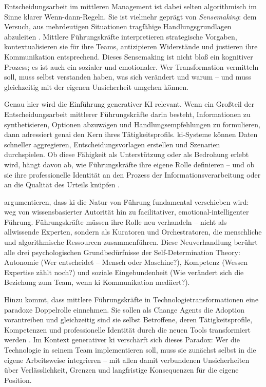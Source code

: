 Entscheidungsarbeit im mittleren Management ist dabei selten algorithmisch im Sinne klarer Wenn-dann-Regeln. Sie ist vielmehr geprägt von \textit{Sensemaking}: dem Versuch, aus mehrdeutigen Situationen tragfähige Handlungsgrundlagen abzuleiten \parencite{quaquebekeNowNewNext2023}. Mittlere Führungskräfte interpretieren strategische Vorgaben, kontextualisieren sie für ihre Teams, antizipieren Widerstände und justieren ihre Kommunikation entsprechend. Dieses Sensemaking ist nicht bloß ein kognitiver Prozess; es ist auch ein sozialer und emotionaler. Wer Transformation vermitteln soll, muss selbst verstanden haben, was sich verändert und warum -- und muss gleichzeitig mit der eigenen Unsicherheit umgehen können.

Genau hier wird die Einführung generativer KI relevant. Wenn ein Großteil der Entscheidungsarbeit mittlerer Führungskräfte darin besteht, Informationen zu synthetisieren, Optionen abzuwägen und Handlungsempfehlungen zu formulieren, dann adressiert \gls{genai} den Kern ihres Tätigkeitsprofils. \acrshort{ki}-Systeme können Daten schneller aggregieren, Entscheidungsvorlagen erstellen und Szenarien durchspielen. Ob diese Fähigkeit als Unterstützung oder als Bedrohung erlebt wird, hängt davon ab, wie Führungskräfte ihre eigene Rolle definieren -- und ob sie ihre professionelle Identität an den Prozess der Informationsverarbeitung oder an die Qualität des Urteils knüpfen \parencite{quaquebekeNowNewNext2023}.

\textcite{quaquebekeNowNewNext2023} argumentieren, dass \gls{ki} die Natur von Führung fundamental verschieben wird: weg von wissensbasierter Autorität hin zu facilitativer, emotional-intelligenter Führung. Führungskräfte müssen ihre Rolle neu verhandeln -- nicht als allwissende Experten, sondern als Kuratoren und Orchestratoren, die menschliche und algorithmische Ressourcen zusammenführen. Diese Neuverhandlung berührt alle drei psychologischen Grundbedürfnisse der Self-Determination Theory: Autonomie (Wer entscheidet -- Mensch oder Maschine?), Kompetenz (Wessen Expertise zählt noch?) und soziale Eingebundenheit (Wie verändert sich die Beziehung zum Team, wenn \gls{ki} Kommunikation mediiert?).

Hinzu kommt, dass mittlere Führungskräfte in Technologietransformationen eine paradoxe Doppelrolle einnehmen. Sie sollen als Change Agents die Adoption vorantreiben und gleichzeitig sind sie selbst Betroffene, deren Tätigkeitsprofile, Kompetenzen und professionelle Identität durch die neuen Tools transformiert werden \parencite{quaquebekeNowNewNext2023}. Im Kontext generativer \gls{ki} verschärft sich dieses Paradox: Wer die Technologie in seinem Team implementieren soll, muss sie zunächst selbst in die eigene Arbeitsweise integrieren -- mit allen damit verbundenen Unsicherheiten über Verlässlichkeit, Grenzen und langfristige Konsequenzen für die eigene Position.

